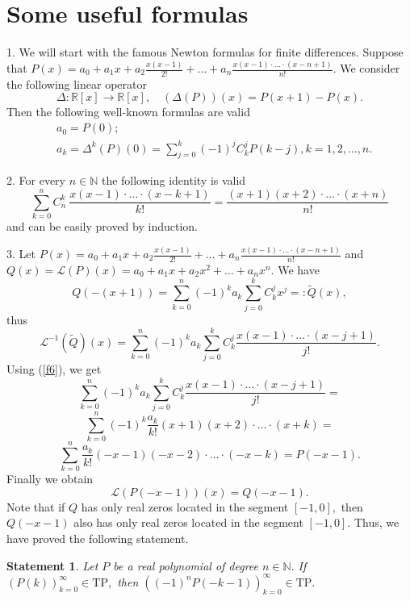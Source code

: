 \documentclass[12pt]{amsart}
\newcounter{count}
\numberwithin{count}{section}
\newtheorem{Statement}[count]{Statement}
\begin{document}
\section{Some useful formulas}

1. We will start with the famous Newton formulas for finite differences.
Suppose that $P(x)= a_0 + a_1 x +a_2 \frac{x(x-1)}{2!} 
+  \ldots +a_n \frac{x(x-1)\cdot \ldots \cdot (x-n+1)}{n!}.$ We consider
the following linear operator
\begin{equation}
\label{fd}
\Delta:  \mathbb{R}[x] \rightarrow \mathbb{R}[x], \quad (\Delta(P))(x) = P(x+1) -P(x).
\end{equation}
Then the following well-known formulas are valid
\begin{eqnarray}
\label{fd1}
&   a_0 = P(0); \\ \nonumber &
a_k = \Delta^k(P)(0) = \sum_{j=0}^k (-1)^j   C_k^j P(k-j),  k=1, 2, \ldots, n.
\end{eqnarray}

2.  For every $n \in \mathbb{N}$ the following identity is valid 
\begin{equation}
\label{f6}
\sum_{k=0}^n C_n^k \   \frac{x(x-1)\cdot \ldots \cdot (x-k+1)}{k!}= \frac{(x+1)(x+2) \cdot 
\ldots \cdot (x+n)}{n!}
\end{equation}
and can be easily proved by induction.

3. Let $P(x)= a_0 + a_1 x +a_2 \frac{x(x-1)}{2!} +  \ldots +a_n \frac{x(x-1)\cdot \ldots \cdot (x-n+1)}{n!}$ 
and $Q(x)= \mathcal{L}(P)(x) = a_0 +a_1 x +a_2 x^2 + \ldots + a_n x^n.$ We have
$$
  Q(-(x+1)) = \sum_{k=0}^n (-1)^k a_k \sum_{j=0}^k C_k^j x^j =: \tilde{Q} (x), 
$$
thus
$$ \mathcal{L}^{-1}(\tilde{Q} )(x) = \sum_{k=0}^n (-1)^k a_k \sum_{j=0}^k C_k^j  \frac{x(x-1)\cdot \ldots \cdot (x-j+1)}{j!}.  $$
Using (\ref{f6}), we get
$$\sum_{k=0}^n  (-1)^k a_k \sum_{j=0}^k C_k^j  \frac{x(x-1)\cdot \ldots \cdot (x-j+1)}{j!} = $$
$$ \sum_{k=0}^n (-1)^k  \frac{a_k}{k!} (x+1)(x+2)\cdot \ldots \cdot (x +k ) = $$
$$   \sum_{k=0}^n   \frac{a_k}{k!} (-x-1)(-x-2)\cdot \ldots \cdot (-x -k ) = P(-x-1).$$
Finally we obtain
\begin{equation}
\label{fd2}
\mathcal{L}(P(-x-1)) (x) = Q(-x-1).
\end{equation}
Note that if $Q$ has only real zeros located in the segment $[-1, 0],$ 
then $Q(-x-1)$ also  has only real zeros located in the segment $[-1, 0].$
Thus, we have proved the following statement.
 
\begin{Statement}
\label{St0}
Let $P$ be a real polynomial of degree $n\in \mathbb{N}.$  If $(P(k))_{k=0}^\infty \in \mathrm{TP},$ then $\left((-1)^n 
P(-k-1)\right)_{k=0}^\infty \in \mathrm{TP}.$
\end{Statement}
\end{document}
